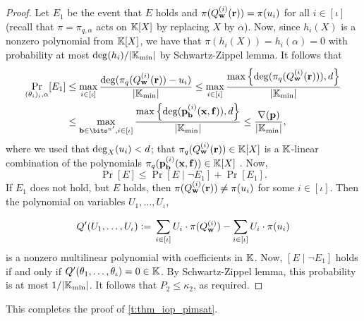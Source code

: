 \documentclass[11pt,letterpaper,usenames,dvipsnames]{article}
\begin{document}
\begin{proof}
Let $E_1$ be the event that  $E$ holds and
%
$\pi(Q_{\mathbf{w}}^{(i)}(\mathbf{r})) =\pi(u_i)$ for all $i\in [\iota]$ (recall that $\pi=\pi_{q,\alpha}$ acts on $\mathbb{K}[X]$ by replacing $X$ by $\alpha$).  Now, since $h_i(X)$ is a nonzero polynomial from $\mathbb{K}[X]$, we have that $\pi(h_i(X)) = h_i(\alpha) =0$ with probability at most $\deg(h_i)/|\mathbb{K}_{\min}|$ by Schwartz-Zippel lemma. It follows that 
%
%
\begin{align*}
\Pr_{(\theta_i)_i, \alpha}[E_1] &\leq \max_{i\in [\iota]} \frac{\deg(\pi_q(Q_{\ww}^{(i)}(\rr)) - u_i)}{|\KK_{\min}|}\leq  \max_{i\in [\iota]} \frac{\max\left\{\deg(\pi_q(Q_{\ww}^{(i)}(\rr))),\moduledegree\right\}}{|\KK_{\min}|}\\ &\leq  \max_{\bb\in \bits^{n'},i\in [\iota]} \frac{\max\left\{\deg(\pp_\bb^{(i)}(\xx,\ff)),\moduledegree\right\}}{|\KK_{\min}|} \leq  \frac{\nabla(\pp)}{|\KK_{\min}|},
\end{align*}
%
where we used that $\deg_X(u_i)< d$; that $\pi_q(Q_{\mathbf{w}}^{(i)}(\mathbf{r}))\in \mathbb{K}[X]$ is a $\mathbb{K}$-linear combination of the polynomials $\pi_q(\mathbf{p}_{\mathbf{b}}^{(i)}(\mathbf{x},\mathbf{f})) \in \mathbb{K}[X]$ . 
%
Now,
$$
\Pr[E]\leq \Pr[E\mid \neg E_1] + \Pr[E_1].
$$
%
If $E_1$ does not hold, but $E$ holds, then $\pi(Q_{\mathbf{w}}^{(i)}(\mathbf{r})) \neq \pi(u_i)$ for some $i\in [\iota]$. Then the polynomial  on variables $U_1,\ldots, U_\iota$,

%
$$
Q'(U_1,\ldots, U_\iota){\;\vcentcolon=\;} \sum_{i\in[\iota]} U_i \cdot \pi(Q_{\mathbf{w}}^{(i)}) - \sum_{i\in [\iota]}U_i \cdot \pi(u_i)
$$
%
is a nonzero multilinear polynomial with coefficients in $\mathbb{K}$. Now, $[E\mid \neg E_1]$ holds if and only if $Q'(\theta_1, \ldots, \theta_\iota)=0\in \mathbb{K}$. By Schwartz-Zippel lemma, this probability is at most $1/|\mathbb{K}_{\min}|$.  It follows that $P_2\leq \kappa_2$, as required. 
%
\end{proof}
This completes the proof of \cref{t:thm_iop_pimsat}.

\end{document}
